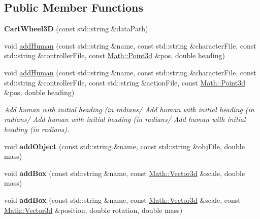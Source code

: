 \subsection*{Public Member Functions}
\begin{DoxyCompactItemize}
\item 
\hypertarget{classCartWheel_1_1CartWheel3D_aa35d49f8b7d9477a8a3308ae66c64a39}{
{\bfseries CartWheel3D} (const std::string \&dataPath)}
\label{classCartWheel_1_1CartWheel3D_aa35d49f8b7d9477a8a3308ae66c64a39}

\item 
void \hyperlink{classCartWheel_1_1CartWheel3D_aa3a23d9a368df62279e75fb67ce1656e}{addHuman} (const std::string \&name, const std::string \&characterFile, const std::string \&controllerFile, const \hyperlink{classCartWheel_1_1Math_1_1Point3d}{Math::Point3d} \&pos, double heading)
\item 
\hypertarget{classCartWheel_1_1CartWheel3D_aa32e24735be8f794fc2fcb73e26b959e}{
void \hyperlink{classCartWheel_1_1CartWheel3D_aa32e24735be8f794fc2fcb73e26b959e}{addHuman} (const std::string \&name, const std::string \&characterFile, const std::string \&controllerFile, const std::string \&actionFile, const \hyperlink{classCartWheel_1_1Math_1_1Point3d}{Math::Point3d} \&pos, double heading)}
\label{classCartWheel_1_1CartWheel3D_aa32e24735be8f794fc2fcb73e26b959e}

\begin{DoxyCompactList}\small\item\em Add human with initial heading (in radians/ Add human with initial heading (in radians/ Add human with initial heading (in radians/ Add human with initial heading (in radians). \item\end{DoxyCompactList}\item 
\hypertarget{classCartWheel_1_1CartWheel3D_ae4b723cbdbb838e1382cba43823ec30f}{
void {\bfseries addObject} (const std::string \&name, const std::string \&objFile, double mass)}
\label{classCartWheel_1_1CartWheel3D_ae4b723cbdbb838e1382cba43823ec30f}

\item 
\hypertarget{classCartWheel_1_1CartWheel3D_a1b6013152e750c3f84807cbe30298a63}{
void {\bfseries addBox} (const std::string \&name, const \hyperlink{classCartWheel_1_1Math_1_1Vector3d}{Math::Vector3d} \&scale, double mass)}
\label{classCartWheel_1_1CartWheel3D_a1b6013152e750c3f84807cbe30298a63}

\item 
\hypertarget{classCartWheel_1_1CartWheel3D_aa9d4b016804a5ac2247a830f7a74dc01}{
void {\bfseries addBox} (const std::string \&name, const \hyperlink{classCartWheel_1_1Math_1_1Vector3d}{Math::Vector3d} \&scale, const \hyperlink{classCartWheel_1_1Math_1_1Vector3d}{Math::Vector3d} \&position, double rotation, double mass)}
\label{classCartWheel_1_1CartWheel3D_aa9d4b016804a5ac2247a830f7a74dc01}


\end{DoxyCompactItemize}
